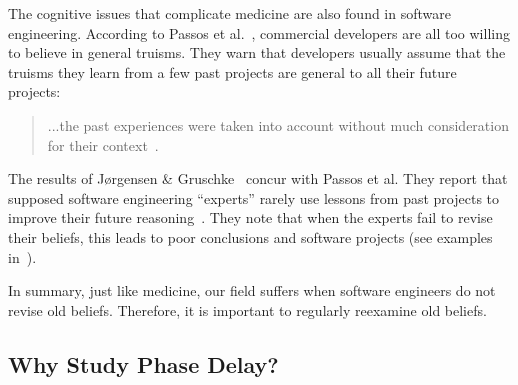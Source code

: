 \documentclass{sig-alternate}
\newcommand{\todo}[1]{\textcolor{Maroon}{TODO: #1}}
\begin{document}
The cognitive issues that complicate medicine are also found in software engineering.
According to Passos et al.~\cite{passos11}, commercial developers
are all too willing to believe in general
truisms.
They  warn that developers
usually assume that the truisms they learn from a few past
projects are general to 
all their future projects:
\begin{quote}\label{q:pass}
...the past experiences were taken into account without 
much consideration for their context~\cite{passos11}.  
\end{quote}
The results of J{\o}rgensen \& Gruschke~\cite{jorgensen09} concur with Passos et al. They report that 
  supposed software engineering    ``experts'' rarely use lessons
  from past projects to improve their future reasoning~\cite{jorgensen09}. 
 They note that
when the experts
  fail to revise their beliefs, this leads to poor
 conclusions and software projects  (see examples in~\cite{jorgensen09}).

In summary, just like medicine, our field suffers when
 software engineers do  not revise old beliefs.  Therefore, it is important
 to regularly  reexamine    old beliefs.
 
\subsection{Why Study Phase Delay?}
\label{sec:why-study}
\end{document}
